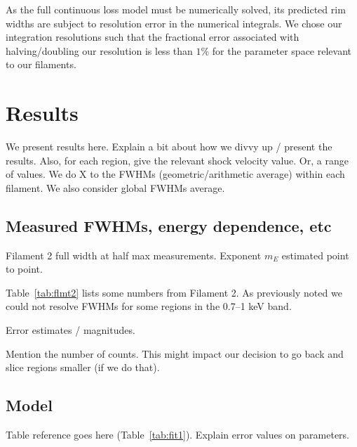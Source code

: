 \documentclass[manuscript]{aastex}  %
\begin{document}
As the full continuous loss model must be numerically solved, its predicted
rim widths are subject to resolution error in the numerical integrals.  We
chose our integration resolutions such that the fractional error associated
with halving/doubling our resolution is less than $1\%$ for the
parameter space relevant to our filaments. 

\section{Results}

We present results here.  Explain a bit about how we divvy up / present the
results.  Also, for each region, give the relevant shock velocity value.  Or, a
range of values.
We do X to the FWHMs (geometric/arithmetic average) within each filament.
We also consider global FWHMs average.

\subsection{Measured FWHMs, energy dependence, etc}

\begin{table*}
\scriptsize
\centering
\caption{Filament 2 full width at half max measurements.
Exponent $m_E$ estimated point to point.\label{tab:flmt2}}

\end{table*}

Table~\ref{tab:flmt2} lists some numbers from Filament 2.  As previously noted
we could not resolve FWHMs for some regions in the 0.7--1 keV band.

Error estimates / magnitudes.

Mention the number of counts.  This might impact our decision to go back and
slice regions smaller (if we do that).

\subsection{Model}

Table reference goes here (Table~\ref{tab:fit1}).
Explain error values on parameters.
\end{document}
